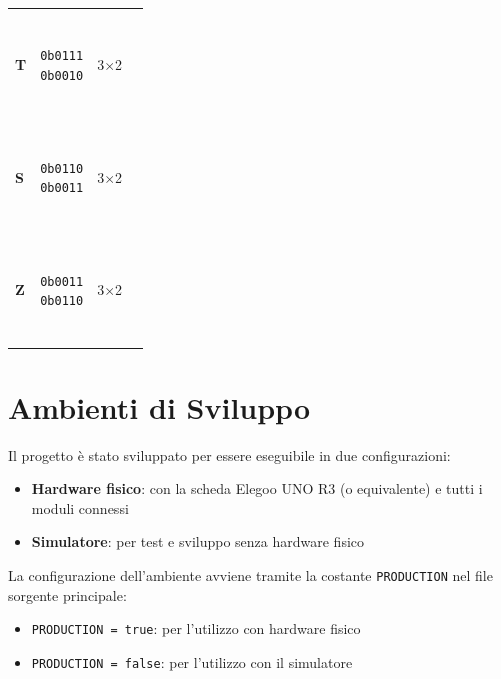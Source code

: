 \documentclass[a4paper, 12pt]{article}
\newcommand{\RedBlock}{\colorbox{red}{\rule{1.2ex}{1.2ex}}}      %
\newcommand{\WhiteBlock}{\fcolorbox{black}{white}{\rule{1.2ex}{1.2ex}}} %
\begin{document}
\begin{table}[H]
\begin{tabular}{
            >{\bfseries}l   %
            c               %
            c               %
            l               %
        }
        \addlinespace
        T     & \makecell{\texttt{0b0111}                                                                                                  \\\texttt{0b0010}}
              & 3\(\times\)2
              & \makecell{\WhiteBlock\RedBlock\RedBlock\RedBlock                                                                           \\\WhiteBlock\WhiteBlock\RedBlock\WhiteBlock} \\
        \addlinespace
        S     & \makecell{\texttt{0b0110}                                                                                                  \\\texttt{0b0011}}
              & 3\(\times\)2
              & \makecell{\WhiteBlock\RedBlock\RedBlock\WhiteBlock                                                                         \\\RedBlock\RedBlock\WhiteBlock\WhiteBlock} \\
        \addlinespace
        Z     & \makecell{\texttt{0b0011}                                                                                                  \\\texttt{0b0110}}
              & 3\(\times\)2
              & \makecell{\RedBlock\RedBlock\WhiteBlock\WhiteBlock                                                                         \\\WhiteBlock\RedBlock\RedBlock\WhiteBlock} \\
        \bottomrule
    \end{tabular}
\end{table}

\section{Ambienti di Sviluppo}
\label{sec:ambienti}
Il progetto è stato sviluppato per essere eseguibile in due configurazioni:
\begin{itemize}
    \item \textbf{Hardware fisico}: con la scheda Elegoo UNO R3 (o equivalente) e tutti i moduli connessi
    \item \textbf{Simulatore}: per test e sviluppo senza hardware fisico
\end{itemize}

La configurazione dell'ambiente avviene tramite la costante \texttt{PRODUCTION} nel file sorgente principale:
\begin{itemize}
    \item \texttt{PRODUCTION = true}: per l'utilizzo con hardware fisico
    \item \texttt{PRODUCTION = false}: per l'utilizzo con il simulatore
\end{itemize}
\end{document}
